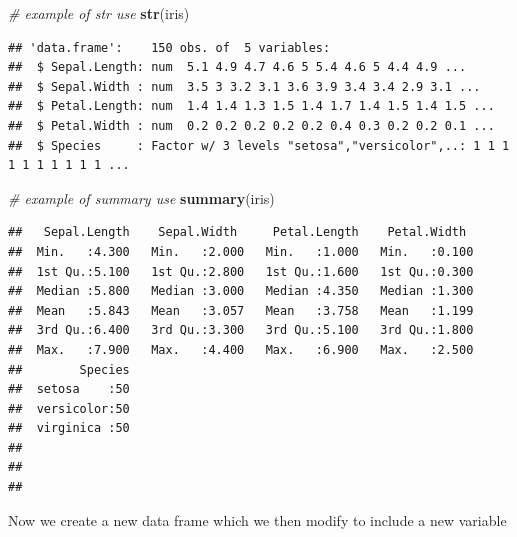 \documentclass[]{book}
\newenvironment{Shaded}{\begin{snugshade}}{\end{snugshade}}
\newcommand{\KeywordTok}[1]{\textcolor[rgb]{0.13,0.29,0.53}{\textbf{#1}}}
\newcommand{\StringTok}[1]{\textcolor[rgb]{0.31,0.60,0.02}{#1}}
\newcommand{\CommentTok}[1]{\textcolor[rgb]{0.56,0.35,0.01}{\textit{#1}}}
\newcommand{\OperatorTok}[1]{\textcolor[rgb]{0.81,0.36,0.00}{\textbf{#1}}}
\newcommand{\NormalTok}[1]{#1}
\theoremstyle{definition}
\theoremstyle{definition}
\theoremstyle{remark}
\begin{document}
\begin{Shaded}
\begin{Highlighting}[]
\CommentTok{# example of str use}
\KeywordTok{str}\NormalTok{(iris)}
\end{Highlighting}
\end{Shaded}

\begin{verbatim}
## 'data.frame':    150 obs. of  5 variables:
##  $ Sepal.Length: num  5.1 4.9 4.7 4.6 5 5.4 4.6 5 4.4 4.9 ...
##  $ Sepal.Width : num  3.5 3 3.2 3.1 3.6 3.9 3.4 3.4 2.9 3.1 ...
##  $ Petal.Length: num  1.4 1.4 1.3 1.5 1.4 1.7 1.4 1.5 1.4 1.5 ...
##  $ Petal.Width : num  0.2 0.2 0.2 0.2 0.2 0.4 0.3 0.2 0.2 0.1 ...
##  $ Species     : Factor w/ 3 levels "setosa","versicolor",..: 1 1 1 1 1 1 1 1 1 1 ...
\end{verbatim}

\begin{Shaded}
\begin{Highlighting}[]
\CommentTok{# example of summary use}
\KeywordTok{summary}\NormalTok{(iris)}
\end{Highlighting}
\end{Shaded}

\begin{verbatim}
##   Sepal.Length    Sepal.Width     Petal.Length    Petal.Width   
##  Min.   :4.300   Min.   :2.000   Min.   :1.000   Min.   :0.100  
##  1st Qu.:5.100   1st Qu.:2.800   1st Qu.:1.600   1st Qu.:0.300  
##  Median :5.800   Median :3.000   Median :4.350   Median :1.300  
##  Mean   :5.843   Mean   :3.057   Mean   :3.758   Mean   :1.199  
##  3rd Qu.:6.400   3rd Qu.:3.300   3rd Qu.:5.100   3rd Qu.:1.800  
##  Max.   :7.900   Max.   :4.400   Max.   :6.900   Max.   :2.500  
##        Species  
##  setosa    :50  
##  versicolor:50  
##  virginica :50  
##                 
##                 
## 
\end{verbatim}

Now we create a new data frame which we then modify to include a new
variable

\begin{Shaded}
\end{Shaded}
\end{document}
